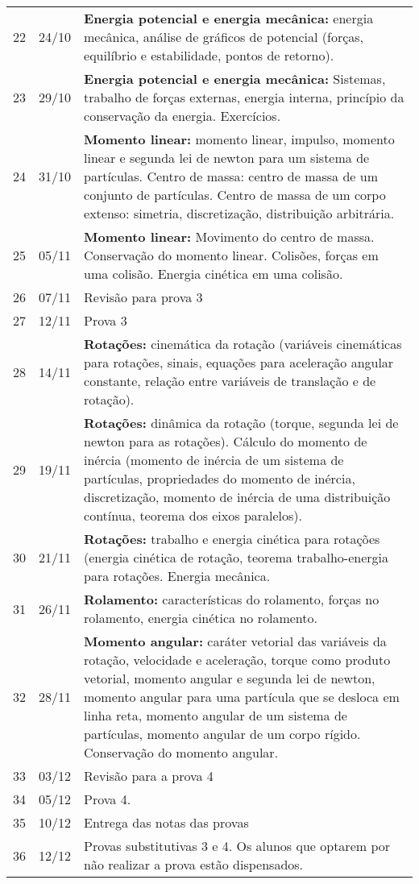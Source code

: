 \begin{center}
\begin{longtable}{ccp{70mm}}
 22 & 24/10 & \textbf{Energia potencial e energia mecânica:} energia mecânica, análise de gráficos de potencial (forças, equilíbrio e estabilidade, pontos de retorno). \\
 23 & 29/10 & \textbf{Energia potencial e energia mecânica:} Sistemas, trabalho de forças externas, energia interna, princípio da conservação da energia. Exercícios.\\
 24 & 31/10 & \textbf{Momento linear:} momento linear, impulso, momento linear e segunda lei de newton para um sistema de partículas. Centro de massa: centro de massa de um conjunto de partículas. Centro de massa de um corpo extenso: simetria, discretização, distribuição arbitrária. \\
 25 & 05/11 & \textbf{Momento linear:} Movimento do centro de massa. Conservação do momento linear. Colisões, forças em uma colisão. Energia cinética em uma colisão. \\
 26 & 07/11 & Revisão para prova 3\\
 27 & 12/11 & Prova 3\\
 28 & 14/11 & \textbf{Rotações:} cinemática da rotação (variáveis cinemáticas para rotações, sinais, equações para aceleração angular constante, relação entre variáveis de translação e de rotação).\\
 29 & 19/11 & \textbf{Rotações:} dinâmica da rotação (torque, segunda lei de newton para as rotações). Cálculo do momento de inércia (momento de inércia de um sistema de partículas, propriedades do momento de inércia, discretização, momento de inércia de uma distribuição contínua, teorema dos eixos paralelos). \\
 30 & 21/11 & \textbf{Rotações:} trabalho e energia cinética para rotações (energia cinética de rotação, teorema trabalho-energia para rotações. Energia mecânica.\\
 31 & 26/11 & \textbf{Rolamento:} características do rolamento, forças no rolamento, energia cinética no rolamento.\\
 32 & 28/11 & \textbf{Momento angular:} caráter vetorial das variáveis da rotação, velocidade e aceleração, torque como produto vetorial, momento angular e segunda lei de newton, momento angular para uma partícula que se desloca em linha reta, momento angular de um sistema de partículas, momento angular de um corpo rígido. Conservação do momento angular.\\
 33 & 03/12 & Revisão para a prova 4\\
 34 & 05/12 & Prova 4.\\
 35 & 10/12 & Entrega das notas das provas\\
 36 & 12/12 & Provas substitutivas 3 e 4. Os alunos que optarem por não realizar a prova estão dispensados.
\end{longtable}
\end{center}
\cleardoublepage
